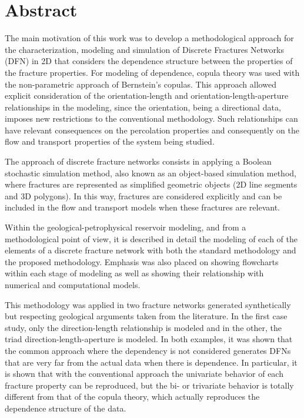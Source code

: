 \chapter*{Abstract}
The main motivation of this work was to develop a methodological approach for the characterization, modeling and simulation of Discrete Fractures Networks (DFN) in 2D that considers the dependence structure between the properties of the fracture properties. For modeling of dependence, copula theory was used with the non-parametric approach of Bernstein's copulas. This approach allowed explicit consideration of the orientation-length and orientation-length-aperture relationships in the modeling, since the orientation, being a directional data, imposes new restrictions to the conventional methodology. Such relationships can have relevant consequences on the percolation properties and consequently on the flow and transport properties of the system being studied.

The approach of discrete fracture networks consists in applying a Boolean stochastic simulation method, also known as an object-based simulation method, where fractures are represented as simplified geometric objects (2D line segments and 3D polygons). In this way, fractures are considered explicitly and can be included in the flow and transport models when these fractures are relevant.

Within the geological-petrophysical reservoir modeling, and from a methodological point of view, it is described in detail the modeling of each of the elements of a discrete fracture network with both the standard methodology and the proposed methodology. Emphasis was also placed on showing flowcharts within each stage of modeling as well as showing their relationship with numerical and computational models.

This methodology was applied in two fracture networks generated synthetically but respecting geological arguments taken from the literature. In the first case study, only the direction-length relationship is modeled and in the other, the triad direction-length-aperture is modeled. In both examples, it was shown that the common approach where the dependency is not considered generates DFNs that are very far from the actual data when there is dependence. In particular, it is shown that with the conventional approach the univariate behavior of each fracture property can be reproduced, but the bi- or trivariate behavior is totally different from that of the copula theory, which actually reproduces the dependence structure of the data.
